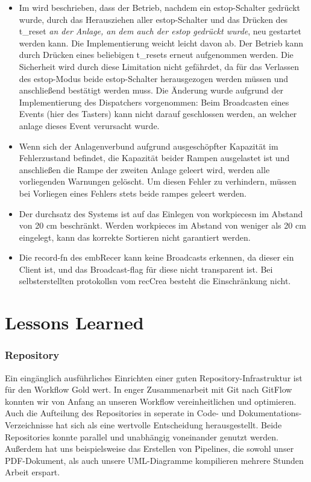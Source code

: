 \begin{itemize}
    \item Im  wird beschrieben, dass der Betrieb, nachdem ein \gls{estop}-Schalter gedrückt wurde,
    durch das Herausziehen aller \gls{estop}-Schalter und das Drücken des \gls{t_reset}
    \textit{an der Anlage, an dem auch der \gls{estop} gedrückt wurde}, neu gestartet werden kann.
    Die Implementierung weicht leicht davon ab.
    Der Betrieb kann durch Drücken eines beliebigen \glspl{t_reset} erneut aufgenommen werden.
    Die Sicherheit wird durch diese Limitation nicht gefährdet, da für das Verlassen des
    \gls{estop}-Modus beide \gls{estop}-Schalter herausgezogen werden müssen und anschließend
    bestätigt werden muss.
    Die Änderung wurde aufgrund der Implementierung des Dispatchers vorgenommen:
    Beim Broadcasten eines Events (hier des Tasters) kann nicht darauf geschlossen werden, an
    welcher \gls{anlage} dieses Event verursacht wurde.
    \item Wenn sich der Anlagenverbund aufgrund ausgeschöpfter Kapazität im Fehlerzustand befindet,
    die Kapazität beider Rampen ausgelastet ist und anschließen die Rampe der zweiten Anlage
    geleert wird, werden alle vorliegenden Warnungen gelöscht.
    Um diesen Fehler zu verhindern, müssen bei Vorliegen eines Fehlers stets beide \glspl{rampe}
    geleert werden.
    \item Der \gls{durchsatz} des Systems ist auf das Einlegen von \glspl{workpiece}n im
    Abstand von 20 cm beschränkt.
    Werden \glspl{workpiece} im Abstand von weniger als 20 cm eingelegt, kann das korrekte Sortieren
    nicht garantiert werden.
    \item Die \gls{record-fn} des \gls{embRecer} kann keine Broadcasts erkennen, da dieser ein
    Client ist, und das Broadcast-flag für diese nicht transparent ist.
    Bei selbsterstellten \glspl{protokoll}n vom \gls{recCrea} besteht die Einschränkung nicht.
\end{itemize}


\section{Lessons Learned}\label{sec:lessons-learned}

\subsubsection{Repository}
Ein eingänglich ausführliches Einrichten einer guten Repository-Infrastruktur ist für den Workflow
Gold wert.
In enger Zusammenarbeit mit Git nach GitFlow konnten wir von Anfang an unseren Workflow vereinheitlichen
und optimieren.
Auch die Aufteilung des Repositories in seperate in Code- und Dokumentations-Verzeichnisse hat sich als
eine wertvolle Entscheidung herausgestellt.
Beide Repositories konnte parallel und unabhängig voneinander genutzt werden.
Außerdem hat uns beispielsweise das Erstellen von Pipelines, die sowohl unser PDF-Dokument, als auch unsere
UML-Diagramme kompilieren mehrere Stunden Arbeit erspart.


